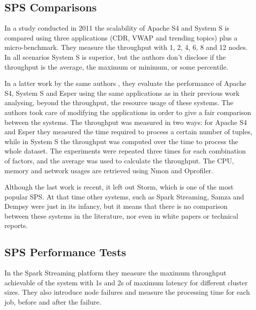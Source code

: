 \documentclass[ppgc,diss,english]{iiufrgs}
\begin{document}
\subsection{SPS Comparisons}

In a study conducted in 2011 \cite{dayarathna2011performance} the scalability of Apache S4 and System S is compared using three applications (CDR, VWAP and trending topics) plus a micro-benchmark. They measure the throughput with 1, 2, 4, 6, 8 and 12 nodes. In all scenarios System S is superior, but the authors don't disclose if the throughput is the average, the maximum or minimum, or some percentile.

In a latter work by the same authors \cite{dayarathna2013performance}, they evaluate the performance of Apache S4, System S and Esper using the same applications as in their previous work analysing, beyond the throughput, the resource usage of these systems. The authors took care of modifying the applications in order to give a fair comparison between the systems. The throughput was measured in two ways: for Apache S4 and Esper they measured the time required to process a certain number of tuples, while in System S the throughput was computed over the time to process the whole dataset. The experiments were repeated three times for each combination of factors, and the average was used to calculate the throughput. The CPU, memory and network usages are retrieved using Nmon and Oprofiler.

Although the last work is recent, it left out Storm, which is one of the most popular SPS. At that time other systems, such as Spark Streaming, Samza and Dempsy were just in its infancy, but it means that there is no comparison between these systems in the literature, nor even in white papers or technical reports.

\subsection{SPS Performance Tests}

In the Spark Streaming platform \cite{zaharia2012discretized} they measure the maximum throughput achievable of the system with 1s and 2s of maximum latency for different cluster sizes. They also introduce node failures and measure the processing time for each job, before and after the failure.
\end{document}
